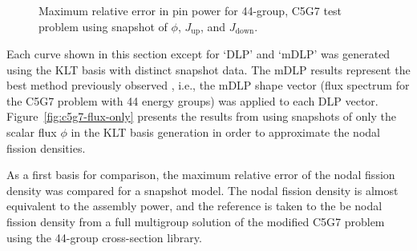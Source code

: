\documentclass[5p,times,twocolumn,10pt]{elsarticle}
\newcommand{\FIGURE}[1]{Figure~\ref{#1}}
\begin{document}
\begin{figure}[htb]
\caption{Maximum relative error in pin power for 44-group, C5G7 test problem using snapshot of $\phi$, $J_{\text{up}}$, and $J_{\text{down}}$.}
\label{fig:c5g7-combined-pp}
\end{figure}

Each curve shown in this section except for `DLP' and `mDLP' was 
generated using the KLT basis with distinct snapshot data. The mDLP results 
represent the best method previously observed \cite{roberts2014psb}, i.e., the 
mDLP shape vector (flux spectrum for the C5G7 problem with 44 energy groups)
was applied to each DLP vector.  
\FIGURE{fig:c5g7-flux-only} presents the results from using snapshots of only 
the scalar flux $\phi$ in the KLT basis generation in order to approximate the 
nodal fission densities.  

As a first basis for comparison, the maximum relative error of the nodal fission density
was compared for a snapshot 
model.  The nodal fission density is almost equivalent to the assembly power, 
and the reference is taken to the be nodal fission density from a full 
multigroup solution of the modified C5G7 problem using the 44-group cross-section 
library. 
\end{document}
